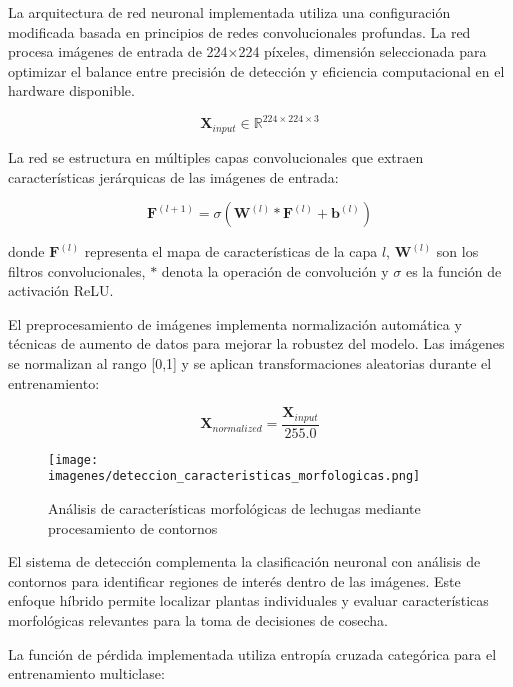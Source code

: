 La arquitectura de red neuronal implementada utiliza una configuración modificada basada en principios de redes convolucionales profundas. La red procesa imágenes de entrada de 224×224 píxeles, dimensión seleccionada para optimizar el balance entre precisión de detección y eficiencia computacional en el hardware disponible.

\begin{equation}
\mathbf{X}_{input} \in \mathbb{R}^{224 \times 224 \times 3}
\end{equation}

La red se estructura en múltiples capas convolucionales que extraen características jerárquicas de las imágenes de entrada:

\begin{equation}
\mathbf{F}^{(l+1)} = \sigma(\mathbf{W}^{(l)} * \mathbf{F}^{(l)} + \mathbf{b}^{(l)})
\end{equation}

donde $\mathbf{F}^{(l)}$ representa el mapa de características de la capa $l$, $\mathbf{W}^{(l)}$ son los filtros convolucionales, $*$ denota la operación de convolución y $\sigma$ es la función de activación ReLU.

El preprocesamiento de imágenes implementa normalización automática y técnicas de aumento de datos para mejorar la robustez del modelo. Las imágenes se normalizan al rango [0,1] y se aplican transformaciones aleatorias durante el entrenamiento:

\begin{equation}
\mathbf{X}_{normalized} = \frac{\mathbf{X}_{input}}{255.0}
\end{equation}

\begin{figure}[h]
\centering
\texttt{[image: imagenes/deteccion\_caracteristicas\_morfologicas.png]}
\caption{Análisis de características morfológicas de lechugas mediante procesamiento de contornos}
\label{fig:caracteristicas_morfologicas}
\end{figure}

El sistema de detección complementa la clasificación neuronal con análisis de contornos para identificar regiones de interés dentro de las imágenes. Este enfoque híbrido permite localizar plantas individuales y evaluar características morfológicas relevantes para la toma de decisiones de cosecha.

La función de pérdida implementada utiliza entropía cruzada categórica para el entrenamiento multiclase:

